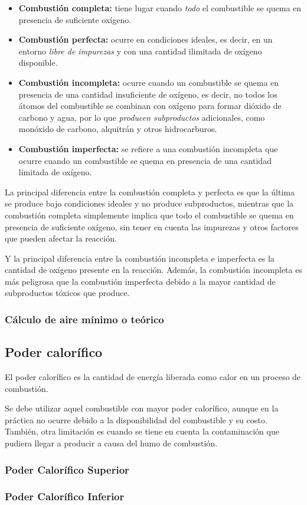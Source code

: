 \begin{itemize}
	\item \textbf{Combustión completa:} tiene lugar cuando \textsl{todo} el combustible se quema en presencia de suficiente oxígeno.
	\item \textbf{Combustión perfecta:} ocurre en condiciones ideales, es decir, en un entorno \textsl{libre de impurezas} y con una cantidad ilimitada de oxígeno disponible.
	\item \textbf{Combustión incompleta:} ocurre cuando un combustible se quema en presencia de una cantidad insuficiente de oxígeno, es decir, no todos los átomos del combustible se combinan con oxígeno para formar dióxido de carbono y agua, por lo que \textsl{producen subproductos} adicionales, como monóxido de carbono, alquitrán y otros hidrocarburos.
	\item \textbf{Combustión imperfecta:} se refiere a una combustión incompleta que ocurre cuando un combustible se quema en presencia de una cantidad limitada de oxígeno.
\end{itemize}


La principal diferencia entre la combustión completa y perfecta es que la última se produce bajo condiciones ideales y no produce subproductos, mientras que la combustión completa simplemente implica que todo el combustible se quema en presencia de suficiente oxígeno, sin tener en cuenta las impurezas y otros factores que pueden afectar la reacción.


Y la principal diferencia entre la combustión incompleta e imperfecta es la cantidad de oxígeno presente en la reacción. Además, la combustión incompleta es más peligrosa que la combustión imperfecta debido a la mayor cantidad de subproductos tóxicos que produce.

\subsubsection{Cálculo de aire mínimo o teórico}

\subsection{Poder calorífico}
El poder calorífico es la cantidad de energía liberada como calor en un proceso de combustión.

Se debe utilizar aquel combustible con mayor poder calorífico, aunque en la práctica no ocurre debido a la disponibilidad del combustible y su costo. También, otra limitación es cuando se tiene en cuenta la contaminación que pudiera llegar a producir a causa del humo de combustión.
	

\subsubsection{Poder Calorífico Superior}

\subsubsection{Poder Calorífico Inferior}